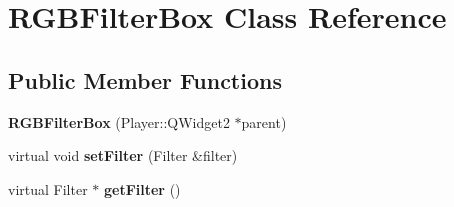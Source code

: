 \hypertarget{classRGBFilterBox}{}\section{R\+G\+B\+Filter\+Box Class Reference}
\label{classRGBFilterBox}
\subsection*{Public Member Functions}
\begin{DoxyCompactItemize}
\item 
\hypertarget{classRGBFilterBox_a3c9f7e343be9aea5b4d9a6668bfa6297}{}{\bfseries R\+G\+B\+Filter\+Box} (Player\+::\+Q\+Widget2 $\ast$parent)\label{classRGBFilterBox_a3c9f7e343be9aea5b4d9a6668bfa6297}

\item 
\hypertarget{classRGBFilterBox_a09e99b0db09b8468ce7d7e0f98293ac5}{}virtual void {\bfseries set\+Filter} (Filter \&filter)\label{classRGBFilterBox_a09e99b0db09b8468ce7d7e0f98293ac5}

\item 
\hypertarget{classRGBFilterBox_ad7b14770615490d1445c958c79fd3adb}{}virtual Filter $\ast$ {\bfseries get\+Filter} ()\label{classRGBFilterBox_ad7b14770615490d1445c958c79fd3adb}

\end{DoxyCompactItemize}
